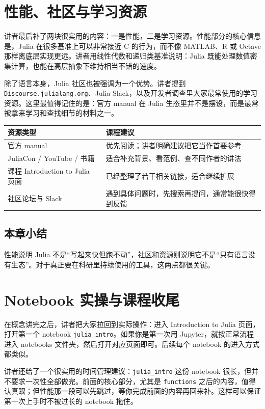 \documentclass[a4paper]{article}
\begin{document}
\section{性能、社区与学习资源}
讲者最后补了两块很实用的内容：一是性能，二是学习资源。性能部分的核心信息是，Julia 在很多基准上可以非常接近 C 的行为，而不像 MATLAB、R 或 Octave 那样离底层实现更远。讲者用线性代数和递归类基准说明：Julia 既能处理数值密集计算，也能在高层抽象下维持相当不错的速度。

除了语言本身，Julia 社区也被强调为一个优势。讲者提到 \texttt{Discourse.julialang.org}、Julia Slack，以及开发者调查里大家最常使用的学习资源。这里最值得记住的是：官方 manual 在 Julia 生态里并不是摆设，而是最常被拿来学习和查找细节的材料之一。

\begin{table}[H]
\centering
\begin{tabular}{@{}p{}p{}@{}}
\toprule
资源类型 & 课程建议 \\
\midrule
官方 manual & 优先阅读；讲者明确建议把它当作首要参考 \\
JuliaCon / YouTube / 书籍 & 适合补充背景、看范例、查不同作者的讲法 \\
课程 Introduction to Julia 页面 & 已经整理了若干相关链接，适合继续扩展 \\
社区论坛与 Slack & 遇到具体问题时，先搜索再提问，通常能很快得到反馈 \\
\bottomrule
\end{tabular}
\end{table}

\subsection{本章小结}
性能说明 Julia 不是“写起来快但跑不动”，社区和资源则说明它不是“只有语言没有生态”。对于真正要在科研里持续使用的工具，这两点都很关键。

\section{Notebook 实操与课程收尾}
在概念讲完之后，讲者把大家拉回到实际操作：进入 Introduction to Julia 页面，打开第一个 notebook \texttt{julia\_intro}。如果你是第一次用 Jupyter，就按正常流程进入 notebooks 文件夹，然后打开对应页面即可。后续每个 notebook 的进入方式都类似。

讲者还给了一个很实用的时间管理建议：\texttt{julia\_intro} 这份 notebook 很长，但并不要求一次性全部做完。前面的核心部分，尤其是 \texttt{functions} 之后的内容，值得认真跟；但性能那一段可以先跳过，等你完成前面的内容再回来补。这样可以保证第一次上手时不被过长的 notebook 拖住。
\end{document}
